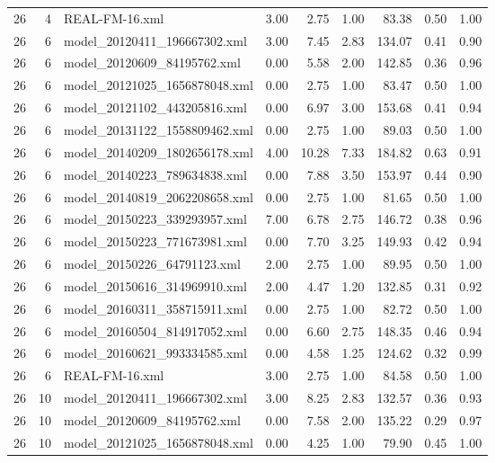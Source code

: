 \begin{table}[ht]
\begin{tabular}{rrlrrrrrr}
   26 &   4 & REAL-FM-16.xml & 3.00 & 2.75 & 1.00 & 83.38 & 0.50 & 1.00 \\ 
   26 &   6 & model\_20120411\_196667302.xml & 3.00 & 7.45 & 2.83 & 134.07 & 0.41 & 0.90 \\ 
   26 &   6 & model\_20120609\_84195762.xml & 0.00 & 5.58 & 2.00 & 142.85 & 0.36 & 0.96 \\ 
   26 &   6 & model\_20121025\_1656878048.xml & 0.00 & 2.75 & 1.00 & 83.47 & 0.50 & 1.00 \\ 
   26 &   6 & model\_20121102\_443205816.xml & 0.00 & 6.97 & 3.00 & 153.68 & 0.41 & 0.94 \\ 
   26 &   6 & model\_20131122\_1558809462.xml & 0.00 & 2.75 & 1.00 & 89.03 & 0.50 & 1.00 \\ 
   26 &   6 & model\_20140209\_1802656178.xml & 4.00 & 10.28 & 7.33 & 184.82 & 0.63 & 0.91 \\ 
   26 &   6 & model\_20140223\_789634838.xml & 0.00 & 7.88 & 3.50 & 153.97 & 0.44 & 0.90 \\ 
   26 &   6 & model\_20140819\_2062208658.xml & 0.00 & 2.75 & 1.00 & 81.65 & 0.50 & 1.00 \\ 
   26 &   6 & model\_20150223\_339293957.xml & 7.00 & 6.78 & 2.75 & 146.72 & 0.38 & 0.96 \\ 
   26 &   6 & model\_20150223\_771673981.xml & 0.00 & 7.70 & 3.25 & 149.93 & 0.42 & 0.94 \\ 
   26 &   6 & model\_20150226\_64791123.xml & 2.00 & 2.75 & 1.00 & 89.95 & 0.50 & 1.00 \\ 
   26 &   6 & model\_20150616\_314969910.xml & 2.00 & 4.47 & 1.20 & 132.85 & 0.31 & 0.92 \\ 
   26 &   6 & model\_20160311\_358715911.xml & 0.00 & 2.75 & 1.00 & 82.72 & 0.50 & 1.00 \\ 
   26 &   6 & model\_20160504\_814917052.xml & 0.00 & 6.60 & 2.75 & 148.35 & 0.46 & 0.94 \\ 
   26 &   6 & model\_20160621\_993334585.xml & 0.00 & 4.58 & 1.25 & 124.62 & 0.32 & 0.99 \\ 
   26 &   6 & REAL-FM-16.xml & 3.00 & 2.75 & 1.00 & 84.58 & 0.50 & 1.00 \\ 
   26 &  10 & model\_20120411\_196667302.xml & 3.00 & 8.25 & 2.83 & 132.57 & 0.36 & 0.93 \\ 
   26 &  10 & model\_20120609\_84195762.xml & 0.00 & 7.58 & 2.00 & 135.22 & 0.29 & 0.97 \\ 
   26 &  10 & model\_20121025\_1656878048.xml & 0.00 & 4.25 & 1.00 & 79.90 & 0.45 & 1.00 \\ 

\end{tabular}
\end{table}
